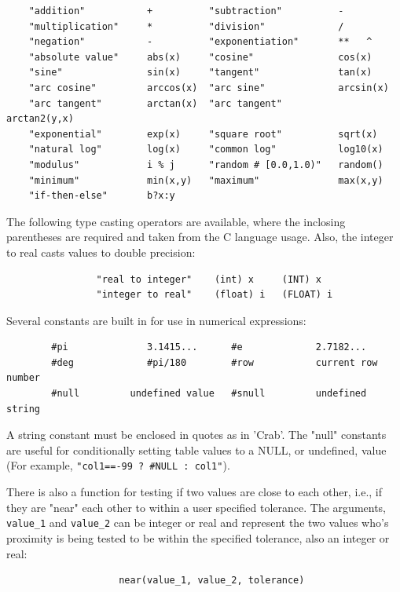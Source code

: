 \documentclass[11pt]{article}
\begin{document}
\begin{verbatim}
    "addition"           +          "subtraction"          -
    "multiplication"     *          "division"             /
    "negation"           -          "exponentiation"       **   ^
    "absolute value"     abs(x)     "cosine"               cos(x)
    "sine"               sin(x)     "tangent"              tan(x)
    "arc cosine"         arccos(x)  "arc sine"             arcsin(x)
    "arc tangent"        arctan(x)  "arc tangent"          arctan2(y,x)
    "exponential"        exp(x)     "square root"          sqrt(x)
    "natural log"        log(x)     "common log"           log10(x)
    "modulus"            i % j      "random # [0.0,1.0)"   random()
    "minimum"            min(x,y)   "maximum"              max(x,y)
    "if-then-else"       b?x:y
\end{verbatim}


The  following  type  casting  operators  are  available,  where the
inclosing parentheses are required and taken  from  the  C  language
usage. Also, the integer to real casts values to double precision:

\begin{verbatim}
                "real to integer"    (int) x     (INT) x
                "integer to real"    (float) i   (FLOAT) i
\end{verbatim}


Several constants are built in  for  use  in  numerical
expressions:


\begin{verbatim}
        #pi              3.1415...      #e             2.7182...
        #deg             #pi/180        #row           current row number
        #null         undefined value   #snull         undefined string
\end{verbatim}

A  string constant must  be enclosed  in quotes  as in  'Crab'.  The
"null" constants  are useful for conditionally  setting table values to
a NULL, or undefined, value (For example,  {\tt "col1==-99 ? \#NULL :
col1"}).

There is also a function for testing if  two  values  are  close  to
each  other,  i.e.,  if  they are "near" each other to within a user
specified tolerance. The  arguments,  {\tt value\_1}  and  {\tt value\_2}  can  be
integer  or  real  and  represent  the two values who's proximity is
being tested to be within the specified tolerance, also  an  integer
or real:

\begin{verbatim}
                    near(value_1, value_2, tolerance)
\end{verbatim}
\end{document}
